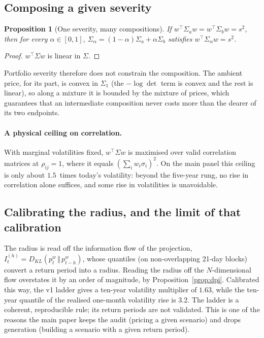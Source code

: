 \documentclass[11pt]{article}
\newtheorem{proposition}{Proposition}
\theoremstyle{definition}
\theoremstyle{remark}
\newcommand{\KL}[2]{D_{KL}\!\left(#1\,\Vert\,#2\right)}
\begin{document}
\subsection{Composing a given severity}

\begin{proposition}[One severity, many compositions]
\label{prop:composition}
If $w^\top\Sigma_aw=w^\top\Sigma_bw=s^2$, then for every $\alpha\in[0,1]$,
$\Sigma_\alpha=(1-\alpha)\Sigma_a+\alpha\Sigma_b$ satisfies
$w^\top\Sigma_\alpha w=s^2$.
\end{proposition}

\begin{proof}
$w^\top\Sigma w$ is linear in $\Sigma$.
\end{proof}

Portfolio severity therefore does not constrain the composition. The ambient
price, for its part, is convex in $\Sigma_1$ (the $-\log\det$ term is convex and
the rest is linear), so along a mixture it is bounded by the mixture of prices,
which guarantees that an intermediate composition never costs more than the
dearer of its two endpoints.

\paragraph{A physical ceiling on correlation.} With marginal volatilities fixed,
$w^\top\Sigma w$ is maximised over valid correlation matrices at
$\rho_{ij}=1$, where it equals $(\sum_iw_i\sigma_i)^2$. On the main panel this
ceiling is only about $1.5$~times today's volatility: beyond the five-year rung,
no rise in correlation alone suffices, and some rise in volatilities is
unavoidable.

\subsection{Calibrating the radius, and the limit of that calibration}

The radius is read off the information flow of the projection,
$I^{(h)}_t=\KL{p^w_t}{p^w_{t-h}}$, whose quantiles (on non-overlapping 21-day
blocks) convert a return period into a radius. Reading the radius off the
$N$-dimensional flow overstates it by an order of magnitude, by
Proposition~\ref{prop:dpi}. Calibrated this way, the v1 ladder gives a ten-year
volatility multiplier of $1.63$, while the ten-year quantile of the realised
one-month volatility rise is $3.2$. The ladder is a coherent, reproducible rule;
its return periods are not validated. This is one of the reasons the main paper
keeps the audit (pricing a given scenario) and drops generation (building a
scenario with a given return period).
\end{document}
